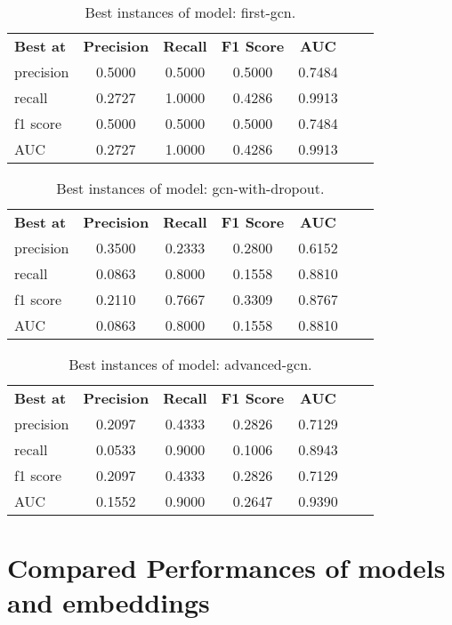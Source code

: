 \begin{table}[H]
    \centering
    \caption{Best instances of model: first-gcn.}
    \begin{tabular}{lcccccc}
      \textbf{Best at}  & \textbf{Precision} & \textbf{Recall} & \textbf{F1 Score} & \textbf{AUC} \\
        precision & 0.5000 & 0.5000 & 0.5000 & 0.7484 \\
        recall & 0.2727 & 1.0000 & 0.4286 & 0.9913 \\
        f1 score & 0.5000 & 0.5000 & 0.5000 & 0.7484 \\
        AUC & 0.2727 & 1.0000 & 0.4286 & 0.9913 \\
    \end{tabular}
\end{table}

\begin{table}[H]
    \centering
    \caption{Best instances of model: gcn-with-dropout.}
    \begin{tabular}{lcccccc}
      \textbf{Best at}  & \textbf{Precision} & \textbf{Recall} & \textbf{F1 Score} & \textbf{AUC} \\
        precision & 0.3500 & 0.2333 & 0.2800 & 0.6152 \\
        recall & 0.0863 & 0.8000 & 0.1558 & 0.8810 \\
        f1 score & 0.2110 & 0.7667 & 0.3309 & 0.8767 \\
        AUC & 0.0863 & 0.8000 & 0.1558 & 0.8810 \\
    \end{tabular}
\end{table}

\begin{table}[H]
    \centering
    \caption{Best instances of model: advanced-gcn.}
    \begin{tabular}{lcccccc}
      \textbf{Best at}  & \textbf{Precision} & \textbf{Recall} & \textbf{F1 Score} & \textbf{AUC} \\
        precision & 0.2097 & 0.4333 & 0.2826 & 0.7129 \\
        recall & 0.0533 & 0.9000 & 0.1006 & 0.8943 \\
        f1 score & 0.2097 & 0.4333 & 0.2826 & 0.7129 \\
        AUC & 0.1552 & 0.9000 & 0.2647 & 0.9390 \\
    \end{tabular}
\end{table}

\section{Compared Performances of models and embeddings}

